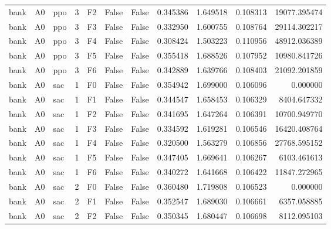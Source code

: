 \begin{tabular}{lllrlllrrrr}
      bank &      A0 &       ppo &     3 &  F2 &           False &            False &  0.345386 &  1.649518 & 0.108313 &     19077.395474 \\
      bank &      A0 &       ppo &     3 &  F3 &           False &            False &  0.332950 &  1.600755 & 0.108764 &     29114.302217 \\
      bank &      A0 &       ppo &     3 &  F4 &           False &            False &  0.308424 &  1.503223 & 0.110956 &     48912.036389 \\
      bank &      A0 &       ppo &     3 &  F5 &           False &            False &  0.355418 &  1.688526 & 0.107952 &     10980.841726 \\
      bank &      A0 &       ppo &     3 &  F6 &           False &            False &  0.342889 &  1.639766 & 0.108403 &     21092.201859 \\
      bank &      A0 &       sac &     1 &  F0 &           False &            False &  0.354942 &  1.699000 & 0.106096 &         0.000000 \\
      bank &      A0 &       sac &     1 &  F1 &           False &            False &  0.344547 &  1.658453 & 0.106329 &      8404.647332 \\
      bank &      A0 &       sac &     1 &  F2 &           False &            False &  0.341695 &  1.647264 & 0.106391 &     10700.949770 \\
      bank &      A0 &       sac &     1 &  F3 &           False &            False &  0.334592 &  1.619281 & 0.106546 &     16420.408764 \\
      bank &      A0 &       sac &     1 &  F4 &           False &            False &  0.320500 &  1.563279 & 0.106856 &     27768.595152 \\
      bank &      A0 &       sac &     1 &  F5 &           False &            False &  0.347405 &  1.669641 & 0.106267 &      6103.461613 \\
      bank &      A0 &       sac &     1 &  F6 &           False &            False &  0.340272 &  1.641668 & 0.106422 &     11847.272965 \\
      bank &      A0 &       sac &     2 &  F0 &           False &            False &  0.360480 &  1.719808 & 0.106523 &         0.000000 \\
      bank &      A0 &       sac &     2 &  F1 &           False &            False &  0.352547 &  1.689030 & 0.106661 &      6357.058885 \\
      bank &      A0 &       sac &     2 &  F2 &           False &            False &  0.350345 &  1.680447 & 0.106698 &      8112.095103 \\

\end{tabular}
